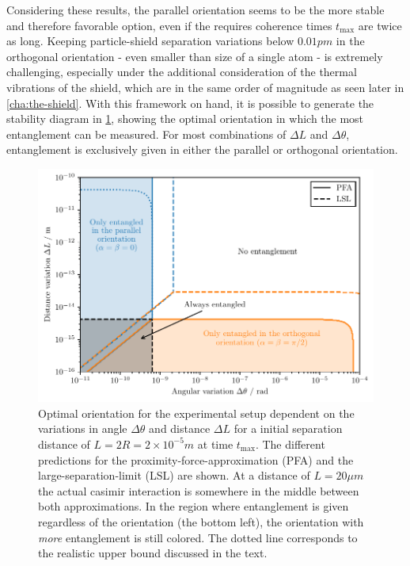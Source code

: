 Considering these results, the parallel orientation seems to be the more stable and therefore favorable option, even if the requires coherence times $t_\mathrm{max}$ are twice as long.
Keeping particle-shield separation variations below $0.01\si{pm}$ in the orthogonal orientation - even smaller than size of a single atom - is extremely challenging,  
especially under the additional consideration of the thermal vibrations of the shield, which are in the same order of magnitude as seen later in \cref{cha:the-shield}.
With this framework on hand, it is possible to generate the stability diagram in \cref{fig:4:optimal-orientation}, showing the optimal orientation in which the most entanglement can be measured.
For most combinations of $\Delta L$ and $\Delta \theta$, entanglement is exclusively given in either the parallel or orthogonal orientation.
\begin{figure}[!htbp]
  \centering
  \includegraphics[width=\textwidth]{./../figures/optimize/optimized-orientation-advanced.pdf}
  \caption{Optimal orientation for the experimental setup dependent on the variations in angle $\Delta\theta$ and distance $\Delta L$ for a initial separation distance of $L=2R=2\times 10^{-5}\si{m}$ at time $t_\mathrm{max}$. The different predictions for the proximity-force-approximation (PFA) and the large-separation-limit (LSL) are shown. At a distance of $L=20\si{\mu m}$ the actual casimir interaction is somewhere in the middle between both approximations. In the region where entanglement is given regardless of the orientation (the bottom left), the orientation with \textit{more} entanglement is still colored. The dotted line corresponds to the realistic upper bound discussed in the text.}
  \label{fig:4:optimal-orientation}
\end{figure}


